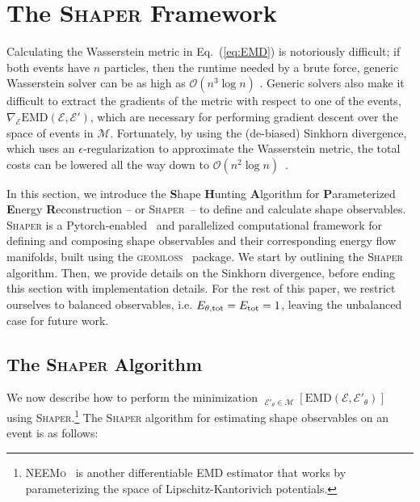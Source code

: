 \documentclass[letterpaper,11pt]{article}
\newcommand{\E}{\mathcal{E}}
\newcommand{\M}{\mathcal{M}}
\newcommand{\EMD}{\text{EMD}}
\DeclareMathOperator*{\paramin}{(arg)min}
\DeclareRobustCommand{\Eq}[1]{Eq.~(\ref{eq:#1})}
\newcommand{\Shaper}{\textsc{Shaper}\xspace}
\begin{document}
\section{The \Shaper Framework}\label{sec:SHAPER}


Calculating the Wasserstein metric in \Eq{EMD} is notoriously difficult; if both events have $n$ particles, then the runtime needed by a brute force, generic Wasserstein solver can be as high as $\mathcal{O}(n^3\log{n})$ \cite{alt_17}. Generic solvers also make it difficult to extract the gradients of the metric with respect to one of the events, $\nabla_{\E}\EMD(\E, \E')$, which are necessary for performing gradient descent over the space of events in $\M$.  Fortunately, by using the (de-biased) Sinkhorn divergence, which uses an $\epsilon$-regularization to approximate the Wasserstein metric, the total costs can be lowered all the way down to $\mathcal{O}({n^2}\log{n})$~\cite{sink_n2ln(n), Sink_ICML_19, sink_nlogn, sink_n_comp, wass_n3_input_dist, feydy2019interpolating}.

In this section, we introduce the \textbf{S}hape \textbf{H}unting \textbf{A}lgorithm for \textbf{P}arameterized \textbf{E}nergy \textbf{R}econstruction -- or \Shaper\ -- to define and calculate shape observables. \Shaper is a {\sc Pytorch}-enabled~\cite{NEURIPS2019_9015} and parallelized computational framework for defining and composing shape observables and their corresponding energy flow manifolds, built using the \textsc{geomloss}~\cite{feydy2019interpolating} package. We start by outlining the \Shaper algorithm. Then, we provide details on the Sinkhorn divergence, before ending this section with implementation details. For the rest of this paper, we restrict ourselves to balanced observables, i.e. $E_{\theta, {\rm tot}} = E_{\rm tot} = 1$, leaving the unbalanced case for future work.



\subsection{The \Shaper Algorithm}\label{sec:algorithm}

We now describe how to perform the minimization $\paramin_{\E'_\theta \in \M}\left[\EMD(\E, \E'_\theta)\right]$ using \Shaper.\footnote{\textsc{NEEMo}~\cite{Kitouni:2022qyr} is another differentiable EMD estimator that works by parameterizing the space of Lipschitz-Kantorivich potentials.} The \Shaper algorithm for estimating shape observables on an event is as follows:
\end{document}
